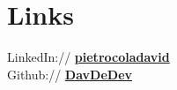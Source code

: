 \section{Links}
LinkedIn://  \href{https://www.linkedin.com/in/pietrocoladavid/}{\bf pietrocoladavid} \\
Github:// \href{https://github.com/DavDeDev}{\bf DavDeDev} \\


